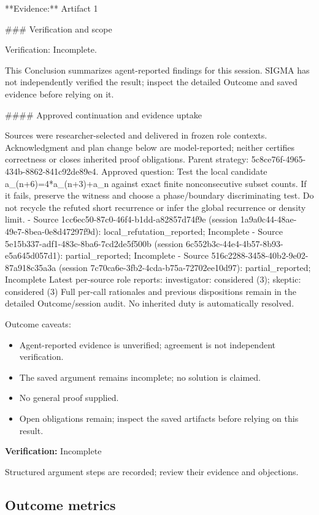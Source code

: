 \documentclass[11pt]{article}
\begin{document}
**Evidence:** Artifact 1

\#\#\# Verification and scope

Verification: Incomplete.

This Conclusion summarizes agent-reported findings for this session. SIGMA has not independently verified the result; inspect the detailed Outcome and saved evidence before relying on it.

\#\#\#\# Approved continuation and evidence uptake

Sources were researcher-selected and delivered in frozen role contexts. Acknowledgment and plan change below are model-reported; neither certifies correctness or closes inherited proof obligations.
Parent strategy: 5c8ce76f-4965-434b-8862-841c92de89e4. Approved question: Test the local candidate a\_(n+6)=4*a\_(n+3)+a\_n against exact finite nonconsecutive subset counts. If it fails, preserve the witness and choose a phase/boundary discriminating test. Do not recycle the refuted short recurrence or infer the global recurrence or density limit.
- Source 1cc6ec50-87c0-46f4-b1dd-a82857d74f9e (session 1a9a0c44-48ae-49e7-8bea-0e8d47297f9d): local\_refutation\_reported; Incomplete
- Source 5e15b337-adf1-483c-8ba6-7cd2de5f500b (session 6c552b3c-44e4-4b57-8b93-e5a645d057d1): partial\_reported; Incomplete
- Source 516c2288-3458-40b2-9e02-87a918c35a3a (session 7c70ca6e-3fb2-4cda-b75a-72702ee10d97): partial\_reported; Incomplete
Latest per-source role reports: investigator: considered (3); skeptic: considered (3)
Full per-call rationales and previous dispositions remain in the detailed Outcome/session audit. No inherited duty is automatically resolved.\par
Outcome caveats:\par
\begin{itemize}
\item Agent-reported evidence is unverified; agreement is not independent verification.
\item The saved argument remains incomplete; no solution is claimed.
\item No general proof supplied.
\item Open obligations remain; inspect the saved artifacts before relying on this result.
\end{itemize}
\textbf{Verification:} Incomplete\par
Structured argument steps are recorded; review their evidence and objections.\par
\subsection{Outcome metrics}
\end{document}
